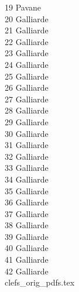 \documentclass[11pt]{book}
\begin{document}
19 Pavane \dotfill \pageref{19_pavane} \\
20 Galliarde \dotfill \pageref{20_galliarde} \\
21 Galliarde\dotfill \pageref{21_galliarde} \\
22 Galliarde\dotfill \pageref{22_galliarde} \\
23 Galliarde\dotfill \pageref{23_galliarde} \\
24 Galliarde\dotfill \pageref{24_galliarde} \\
25 Galliarde\dotfill \pageref{25_galliarde} \\
26 Galliarde\dotfill \pageref{26_galliarde} \\
27 Galliarde\dotfill \pageref{27_galliarde} \\
28 Galliarde\dotfill \pageref{28_galliarde} \\
29 Galliarde\dotfill \pageref{29_galliarde} \\
30 Galliarde\dotfill \pageref{30_galliarde} \\
31 Galliarde\dotfill \pageref{31_galliarde} \\
32 Galliarde\dotfill \pageref{32_galliarde} \\
33 Galliarde\dotfill \pageref{33_galliarde} \\
34 Galliarde\dotfill \pageref{34_galliarde} \\
35 Galliarde\dotfill \pageref{35_galliarde} \\
36 Galliarde\dotfill \pageref{36_galliarde} \\
37 Galliarde\dotfill \pageref{37_galliarde} \\
38 Galliarde\dotfill \pageref{38_galliarde} \\
39 Galliarde\dotfill \pageref{39_galliarde} \\
40 Galliarde\dotfill \pageref{40_galliarde} \\
41 Galliarde\dotfill \pageref{41_galliarde} \\
42 Galliarde\dotfill \pageref{42_galliarde} \\
 {clefs_orig_pdfs.tex}
\end{document}
